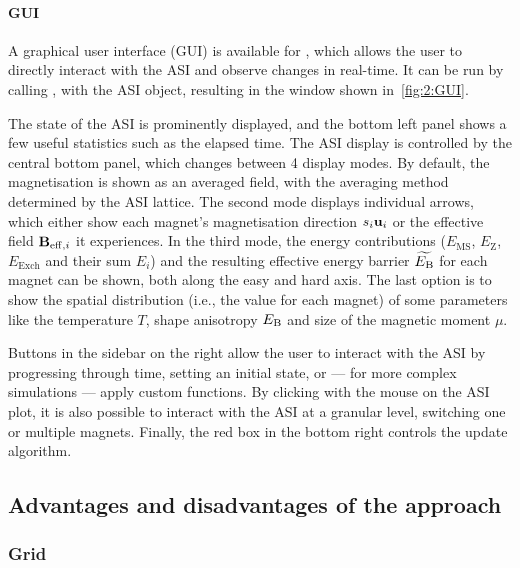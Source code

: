 \paragraph{GUI}
A graphical user interface (GUI) is available for \hotspice, which allows the user to directly interact with the ASI and observe changes in real-time. It can be run by calling , with  the ASI object, resulting in the window shown in~\cref{fig:2:GUI}.


The state of the ASI is prominently displayed, and the bottom left panel shows a few useful statistics such as the elapsed time. The ASI display is controlled by the central bottom panel, which changes between 4 display modes.
By default, the magnetisation is shown as an averaged field, with the averaging method determined by the ASI lattice.
The second mode displays individual arrows, which either show each magnet's magnetisation direction $s_i \boldsymbol{\mathbf{u}}_i$ or the effective field $\boldsymbol{\mathbf{B}}_{\mathrm{eff},i}$ it experiences.
In the third mode, the energy contributions ($E_\mathrm{MS}$, $E_\mathrm{Z}$, $E_\mathrm{Exch}$ and their sum $E_i$) and the resulting effective energy barrier $\widetilde{E_\mathrm{B}}$ for each magnet can be shown, both along the easy and hard axis.
The last option is to show the spatial distribution (i.e., the value for each magnet) of some parameters like the temperature $T$, shape anisotropy $E_\mathrm{B}$ and size of the magnetic moment $\mu$. \par
Buttons in the sidebar on the right allow the user to interact with the ASI by progressing through time, setting an initial state, or --- for more complex simulations --- apply custom functions.
By clicking with the mouse on the ASI plot, it is also possible to interact with the ASI at a granular level, switching one or multiple magnets. Finally, the red box in the bottom right controls the update algorithm.

\subsection{Advantages and disadvantages of the \hotspice approach} %
\subsubsection{Grid} %
